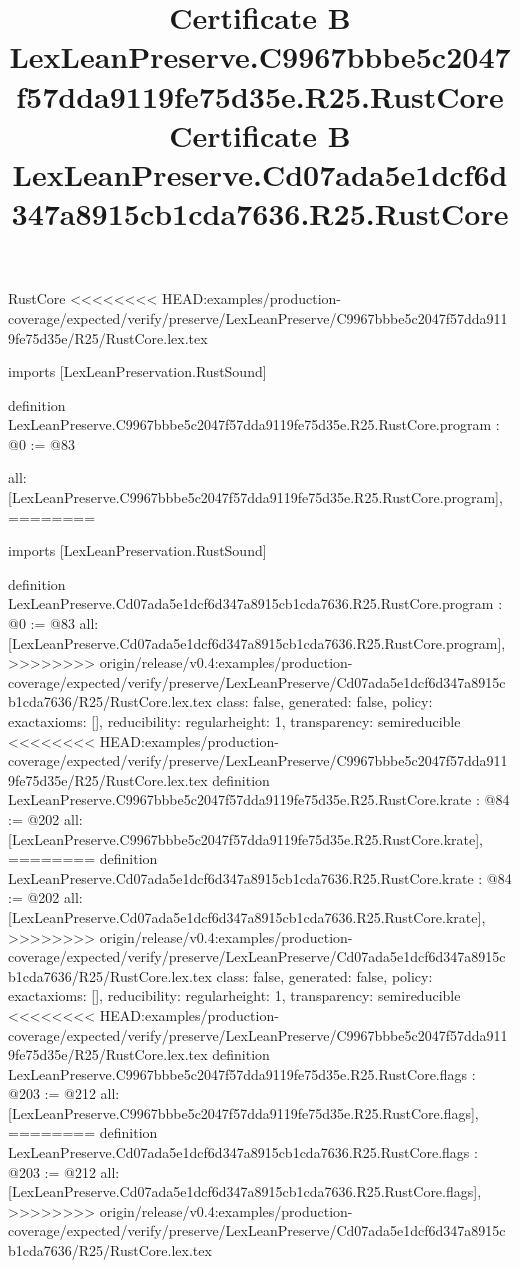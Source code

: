 \begin{lexlean}{RustCore}
<<<<<<<< HEAD:examples/production-coverage/expected/verify/preserve/LexLeanPreserve/C9967bbbe5c2047f57dda9119fe75d35e/R25/RustCore.lex.tex
\title{Certificate B LexLeanPreserve.C9967bbbe5c2047f57dda9119fe75d35e.R25.RustCore}
\begin{coremodule}
imports [LexLeanPreservation.RustSound]

definition LexLeanPreserve.C9967bbbe5c2047f57dda9119fe75d35e.R25.RustCore.program : @0 := @83 {
  all: [LexLeanPreserve.C9967bbbe5c2047f57dda9119fe75d35e.R25.RustCore.program],
========
\title{Certificate B LexLeanPreserve.Cd07ada5e1dcf6d347a8915cb1cda7636.R25.RustCore}
\begin{coremodule}
imports [LexLeanPreservation.RustSound]

definition LexLeanPreserve.Cd07ada5e1dcf6d347a8915cb1cda7636.R25.RustCore.program : @0 := @83 {
  all: [LexLeanPreserve.Cd07ada5e1dcf6d347a8915cb1cda7636.R25.RustCore.program],
>>>>>>>> origin/release/v0.4:examples/production-coverage/expected/verify/preserve/LexLeanPreserve/Cd07ada5e1dcf6d347a8915cb1cda7636/R25/RustCore.lex.tex
  class: false,
  generated: false,
  policy: exact{axioms: []},
  reducibility: regular{height: 1},
  transparency: semireducible
}
<<<<<<<< HEAD:examples/production-coverage/expected/verify/preserve/LexLeanPreserve/C9967bbbe5c2047f57dda9119fe75d35e/R25/RustCore.lex.tex
definition LexLeanPreserve.C9967bbbe5c2047f57dda9119fe75d35e.R25.RustCore.krate : @84 := @202 {
  all: [LexLeanPreserve.C9967bbbe5c2047f57dda9119fe75d35e.R25.RustCore.krate],
========
definition LexLeanPreserve.Cd07ada5e1dcf6d347a8915cb1cda7636.R25.RustCore.krate : @84 := @202 {
  all: [LexLeanPreserve.Cd07ada5e1dcf6d347a8915cb1cda7636.R25.RustCore.krate],
>>>>>>>> origin/release/v0.4:examples/production-coverage/expected/verify/preserve/LexLeanPreserve/Cd07ada5e1dcf6d347a8915cb1cda7636/R25/RustCore.lex.tex
  class: false,
  generated: false,
  policy: exact{axioms: []},
  reducibility: regular{height: 1},
  transparency: semireducible
}
<<<<<<<< HEAD:examples/production-coverage/expected/verify/preserve/LexLeanPreserve/C9967bbbe5c2047f57dda9119fe75d35e/R25/RustCore.lex.tex
definition LexLeanPreserve.C9967bbbe5c2047f57dda9119fe75d35e.R25.RustCore.flags : @203 := @212 {
  all: [LexLeanPreserve.C9967bbbe5c2047f57dda9119fe75d35e.R25.RustCore.flags],
========
definition LexLeanPreserve.Cd07ada5e1dcf6d347a8915cb1cda7636.R25.RustCore.flags : @203 := @212 {
  all: [LexLeanPreserve.Cd07ada5e1dcf6d347a8915cb1cda7636.R25.RustCore.flags],
>>>>>>>> origin/release/v0.4:examples/production-coverage/expected/verify/preserve/LexLeanPreserve/Cd07ada5e1dcf6d347a8915cb1cda7636/R25/RustCore.lex.tex
}}}
\end{coremodule}}
\end{coremodule}
\end{lexlean}
